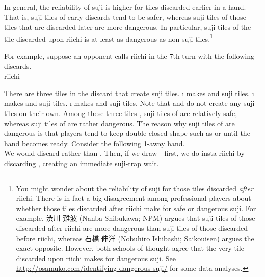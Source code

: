 {{\bigskip
In general, the reliability of {\jap suji} is higher for tiles discarded earlier in a hand. That is, {\jap suji} tiles of early discards tend to be safer, whereas {\jap suji} tiles of those tiles that are discarded later are more dangerous. In particular, {\jap suji} tiles of the tile discarded upon riichi is at least as dangerous as non-{\jap suji} tiles.\footnote{You might wonder about the reliability of {\jap suji} for those tiles discarded \emph{after} riichi. There is in fact a big disagreement among professional players about whether those tiles discarded after riichi make for safe or dangerous {\jap suji}. For example, 渋川 難波 (Nanba Shibukawa; NPM) argues that {\jap suji} tiles of those discarded after riichi are more dangerous than {\jap suji} tiles of those discarded before riichi, whereas 石橋 伸洋 (Nobuhiro Ishibashi; {\jap Saikouisen}) argues the exact opposite. However, both schools of thought agree that the very tile discarded upon riichi makes for dangerous {\jap suji}. See \url{http://osamuko.com/identifying-dangerous-suji/} for some data analyses.} 

\bigskip
For example, suppose an opponent calls riichi in the 7th turn with the following discards.
\bp
\bei\fa{}\\
\hspace{112pt}\footnotesize{riichi}
\ep

\bigskip
There are three tiles in the discard that create {\jap suji} tiles.
\bi
\i {\LARGE{}} makes {\LARGE{}} and {\LARGE{}} {\jap suji} tiles.
\i {\LARGE{}} makes {\LARGE{}} and {\LARGE{}} {\jap suji} tiles.
\i {\LARGE{}} makes {\LARGE{}} and {\LARGE{}} {\jap suji} tiles.
\ei
Note that {\LARGE{}} and {\LARGE{}} do not create any {\jap suji} tiles on their own. Among these three tiles {\LARGE{}}, {\jap suji} tiles of {\LARGE{}} are relatively safe, whereas {\jap suji} tiles of {\LARGE{}} are rather dangerous. 
The reason why {\jap suji} tiles of {\LARGE{}} are dangerous is that players tend to keep double closed shape such as {\LARGE{}} or {\LARGE{}} until the hand becomes ready. Consider the following 1-away hand. 
\bp
{}\\ \vspace{-16pt}
\rfd{}
\ep
We would discard {\LARGE{}} rather than {\LARGE{}}.
Then, if we draw {\LARGE{}-} first, we do insta-riichi by discarding {\LARGE{}}, creating an immediate {\jap suji}-trap wait. 

}}
